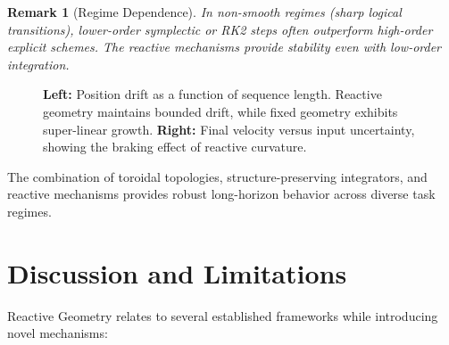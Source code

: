 \documentclass[12pt,letterpaper,twoside]{article}
\newtheorem{remarque}{Remark}[section]
\begin{document}
\begin{remarque}[Regime Dependence]
In non-smooth regimes (sharp logical transitions), lower-order symplectic or RK2 steps often outperform high-order explicit schemes. The reactive mechanisms provide stability even with low-order integration.
\end{remarque}

\begin{figure}[htbp]
\centering
{}
\hfill
{}
\caption{\textbf{Left:} Position drift as a function of sequence length. Reactive geometry maintains bounded drift, while fixed geometry exhibits super-linear growth. \textbf{Right:} Final velocity versus input uncertainty, showing the braking effect of reactive curvature.}
\label{fig:empirical-results}
\end{figure}

The combination of toroidal topologies, structure-preserving integrators, and reactive mechanisms provides robust long-horizon behavior across diverse task regimes.

\section{Discussion and Limitations}

Reactive Geometry relates to several established frameworks while introducing novel mechanisms:
\end{document}
